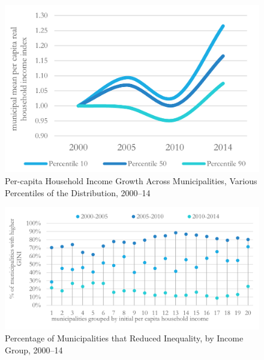 \documentclass[dv_diss_main.tex]{subfiles}
\begin{document}
\begin{figure}[H] 
	\centering 
	
	\includegraphics[width=0.8\linewidth]{figures/FAIS_des_income.png}
	\caption{Per-capita Household Income Growth Across Municipalities, Various Percentiles of the Distribution, 2000–14}\label{fig:des2}
	
	\parbox{\textwidth}{\small 
	\vspace{2eX}
	\scriptsize	
	\pcincomegrowth
	}
\end{figure}
	
\begin{figure}[H] 
	\centering 
	
	\includegraphics[width=\linewidth]{figures/descriptives_1.png}
	\caption{Percentage of Municipalities that Reduced Inequality, by Income Group, 2000–14}\label{fig:des3}
	
	\parbox{\textwidth}{\small 
	\vspace{2eX}
	\scriptsize	
	\pcinequality
	}
\end{figure}

\newpage


\end{document}
